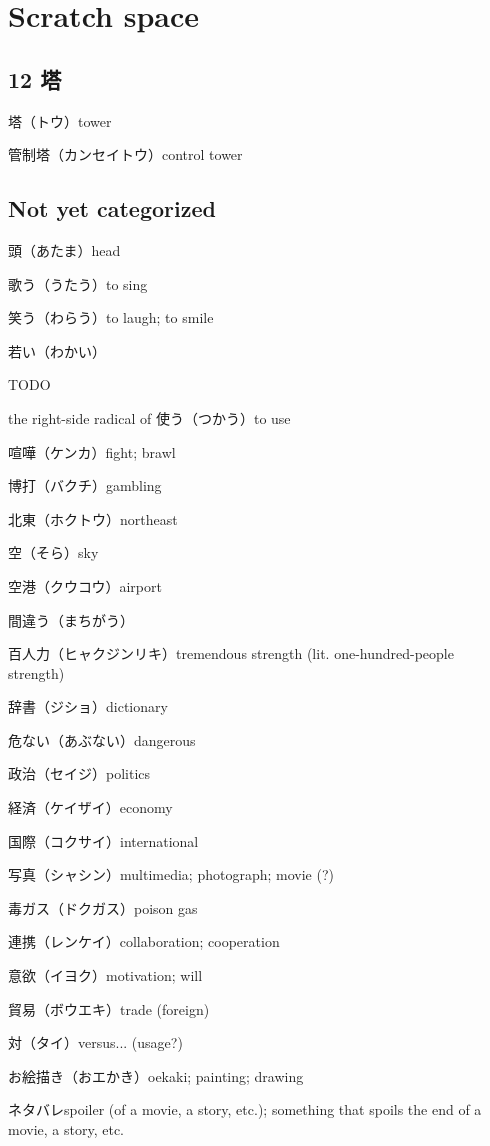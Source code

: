 \chapter{Scratch space}

\section{12 塔}

塔（トウ）tower

管制塔（カンセイトウ）control tower

\section{Not yet categorized}

頭（あたま）head

歌う（うたう）to sing

笑う（わらう）to laugh; to smile

若い（わかい）

TODO

the right-side radical of 使う（つかう）to use

喧嘩（ケンカ）fight; brawl

博打（バクチ）gambling

北東（ホクトウ）northeast

空（そら）sky

空港（クウコウ）airport

間違う（まちがう）

百人力（ヒャクジンリキ）tremendous strength (lit. one-hundred-people strength)

辞書（ジショ）dictionary

危ない（あぶない）dangerous

政治（セイジ）politics

経済（ケイザイ）economy

国際（コクサイ）international

写真（シャシン）multimedia; photograph; movie (?)

毒ガス（ドクガス）poison gas

連携（レンケイ）collaboration; cooperation

意欲（イヨク）motivation; will

貿易（ボウエキ）trade (foreign)

対（タイ）versus... (usage?)

お絵描き（おエかき）oekaki; painting; drawing

ネタバレspoiler (of a movie, a story, etc.); something that spoils the end of a movie, a story, etc.

